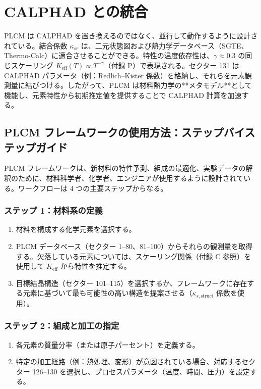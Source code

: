 \documentclass[11pt,a4paper]{article}
\newcommand{\Keff}{K_{\mathrm{eff}}}
\theoremstyle{remark}
\begin{document}
	\section{CALPHAD との統合}
	
	PLCM は CALPHAD を置き換えるのではなく、並行して動作するように設計されている。結合係数 \(\kappa_{sr}\) は、二元状態図および熱力学データベース（SGTE、Thermo-Calc）に適合させることができる。特性の温度依存性は、\(\gamma \approx 0.3\) の同じスケーリング \(\Keff(T) \propto T^{-\gamma}\)（付録 P）で表現される。セクター 131 は CALPHAD パラメータ（例：Redlich–Kister 係数）を格納し、それらを元素観測量に結びつける。したがって、PLCM は材料熱力学の**メタモデル**として機能し、元素特性から初期推定値を提供することで CALPHAD 計算を加速する。
	
	\subsection{PLCM フレームワークの使用方法：ステップバイステップガイド}
	
	PLCM フレームワークは、新材料の特性予測、組成の最適化、実験データの解釈のために、材料科学者、化学者、エンジニアが使用するように設計されている。ワークフローは 4 つの主要ステップからなる。
	
	\subsubsection{ステップ 1：材料系の定義}
	
	\begin{enumerate}
		\item 材料を構成する化学元素を選択する。
		\item PLCM データベース（セクター 1–80、81–100）からそれらの観測量を取得する。欠落している元素については、スケーリング関係（付録 C 参照）を使用して \(\Keff\) から特性を推定する。
		\item 目標結晶構造（セクター 101–115）を選択するか、フレームワークに存在する元素に基づいて最も可能性の高い構造を提案させる（\(\kappa_{s,\text{struct}}\) 係数を使用）。
	\end{enumerate}
	
	\subsubsection{ステップ 2：組成と加工の指定}
	
	\begin{enumerate}
		\item 各元素の質量分率（または原子パーセント）を定義する。
		\item 特定の加工経路（例：熱処理、変形）が意図されている場合、対応するセクター 126–130 を選択し、プロセスパラメータ（温度、時間、圧力）を設定する。
	\end{enumerate}
	
\end{document}
